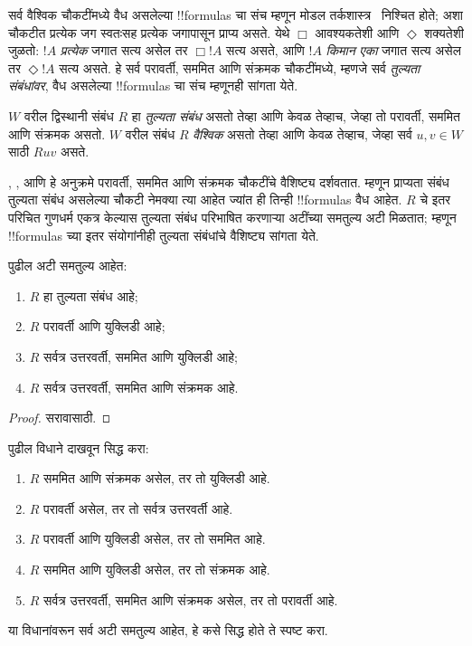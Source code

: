 \documentclass[../../../include/open-logic-section]{subfiles}
\begin{document}


सर्व वैश्विक चौकटींमध्ये वैध असलेल्या !!{formula}s
चा संच म्हणून मोडल तर्कशास्त्र~ निश्चित होते;
अशा चौकटीत प्रत्येक जग स्वतःसह प्रत्येक जगापासून
प्राप्य असते. येथे $\Box$ आवश्यकतेशी आणि
$\Diamond$ शक्यतेशी जुळतो: $!A$ \emph{प्रत्येक}
जगात सत्य असेल तर $\Box !A$ सत्य असते, आणि
$!A$ \emph{किमान एका} जगात सत्य असेल तर
$\Diamond !A$ सत्य असते.  हे सर्व परावर्ती,
सममित आणि संक्रमक चौकटींमध्ये, म्हणजे सर्व
\emph{तुल्यता संबंधांवर}, वैध असलेल्या !!{formula}s
चा संच म्हणूनही सांगता येते.

\begin{defn}
  $W$ वरील द्विस्थानी संबंध $R$ हा \emph{तुल्यता संबंध}
  असतो तेव्हा आणि केवळ तेव्हाच, जेव्हा तो परावर्ती,
  सममित आणि संक्रमक असतो. $W$ वरील संबंध $R$
  \emph{वैश्विक} असतो तेव्हा आणि केवळ तेव्हाच, जेव्हा
  सर्व $u,v \in
  W$ साठी $Ruv$ असते.
\end{defn}

, , आणि  हे अनुक्रमे परावर्ती,
सममित आणि संक्रमक चौकटींचे वैशिष्ट्य दर्शवतात.
म्हणून प्राप्यता संबंध तुल्यता संबंध असलेल्या चौकटी
नेमक्या त्या आहेत ज्यांत ही तिन्ही !!{formula}s वैध
आहेत. $R$ चे इतर परिचित गुणधर्म एकत्र केल्यास
तुल्यता संबंध परिभाषित करणाऱ्या अटींच्या समतुल्य
अटी मिळतात; म्हणून !!{formula}s च्या इतर संयोगांनीही
तुल्यता संबंधांचे वैशिष्ट्य सांगता येते.

\begin{prop}
  पुढील अटी समतुल्य आहेत:
  \begin{enumerate}
  \item $R$ हा तुल्यता संबंध आहे;
  \item $R$ परावर्ती आणि युक्लिडी आहे;
  \item $R$ सर्वत्र उत्तरवर्ती, सममित आणि युक्लिडी आहे;
  \item $R$ सर्वत्र उत्तरवर्ती, सममित आणि संक्रमक आहे.
  \end{enumerate}
\end{prop}

\begin{proof}
  सरावासाठी.
\end{proof}

\begin{prob}
  पुढील विधाने दाखवून 
  सिद्ध करा:
  \begin{enumerate}
  \item $R$ सममित आणि संक्रमक असेल, तर तो युक्लिडी आहे.
  \item $R$ परावर्ती असेल, तर तो सर्वत्र उत्तरवर्ती आहे.
  \item $R$ परावर्ती आणि युक्लिडी असेल, तर तो सममित आहे.
  \item $R$ सममित आणि युक्लिडी असेल, तर तो संक्रमक आहे.
  \item $R$ सर्वत्र उत्तरवर्ती, सममित आणि संक्रमक असेल,
    तर तो परावर्ती आहे.
  \end{enumerate}
  या विधानांवरून सर्व अटी समतुल्य आहेत, हे कसे
  सिद्ध होते ते स्पष्ट करा.
\end{prob}
\end{document}
